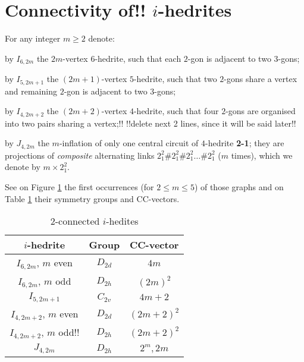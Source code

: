 \documentclass[12pt]{article}
\begin{document}
\section{Connectivity of!! $i$-hedrites}
For any integer $m\geq 2$ denote:

by $I_{6,2m}$ the $2m$-vertex $6$-hedrite, such that each $2$-gon is adjacent to two $3$-gons;

by $I_{5,2m+1}$ the $(2m+1)$-vertex $5$-hedrite, such that 
two $2$-gons share a vertex and remaining $2$-gon is adjacent
to two $3$-gons;

by $I_{4,2m+2}$ the $(2m+2)$-vertex $4$-hedrite, such that 
four $2$-gons are organised into two pairs sharing a vertex;!!
!!delete next 2 lines, since it will be said later!!

by $J_{4,2m}$ the $m$-inflation of only one central circuit of
$4$-hedrite {\bf 2-1}; they are projections of {\em composite}
alternating links $2^2_1\#2^2_1\#2^2_1\dots\#2^2_1$ ($m$ times),
which we denote by $m\times 2^2_1$.

See on Figure \ref{fig:FamilyIin} the first occurrences
(for $2\leq m\leq 5$) of those graphs and on Table \ref{FundamentalInfo}
their symmetry groups and CC-vectors.

\begin{figure}
\centering
\epsfxsize=100mm
\label{fig:FamilyIin}
\end{figure}

\begin{table}
\begin{center}
\begin{tabular}{||c|c|c||}
\hline\hline
$i$-hedrite            &Group      &CC-vector\\\hline\hline
$I_{6,2m}$, $m$ even   &$D_{2d}$   &$4m$\\\hline
$I_{6,2m}$, $m$ odd    &$D_{2h}$   &$(2m)^2$\\\hline
$I_{5,2m+1}$           &$C_{2v}$   &$4m+2$\\\hline
$I_{4,2m+2}$, $m$ even &$D_{2d}$   &$(2m+2)^2$\\\hline
$I_{4,2m+2}$, $m$ odd!!   &$D_{2h}$   &$(2m+2)^2$\\\hline
$J_{4,2m}$              &$D_{2h}$   &$2^m, 2m$\\\hline\hline
\end{tabular}
\end{center}
\caption{$2$-connected $i$-hedites}
\label{FundamentalInfo}
\end{table}
\end{document}
